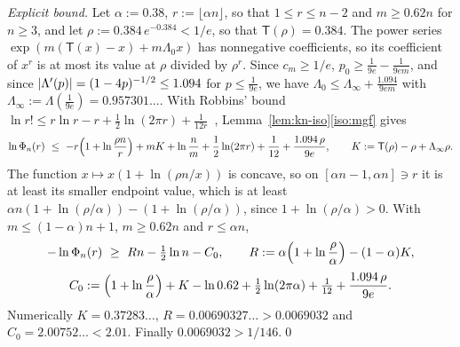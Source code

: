 \emph{Explicit bound.} Let $\alpha:=0.38$, $r:=\lfloor\alpha n\rfloor$, so that $1\le r\le n-2$ and $m\ge0.62n$ for $n\ge3$, and let $\rho:=0.384\,e^{-0.384}<1/e$, so that $\mathsf T(\rho)=0.384$. The power series $\exp(m(\mathsf T(x)-x)+m\Lambda_0x)$ has nonnegative coefficients, so its coefficient of $x^r$ is at most its value at $\rho$ divided by $\rho^r$. Since $c_m\ge1/e$, $p_0\ge\frac1{9e}-\frac1{9em}$, and since $\lvert \Lambda'(p)\rvert=(1-4p)^{-1/2}\le1.094$ for $p\le\frac1{9e}$, we have $\Lambda_0\le\Lambda_\infty+\frac{1.094}{9em}$ with $\Lambda_\infty:=\Lambda(\frac1{9e})=0.957301\ldots$. With Robbins' bound $\ln r!\le r\ln r-r+\frac12\ln(2\pi r)+\frac1{12r}$~\cite{Robbins55}, Lemma~\ref{lem:kn-iso}\ref{iso:mgf} gives
\[
  \ln\Phi_n(r)\ \le\ -r\Bigl(1+\ln\frac{\rho n}r\Bigr)+mK+\ln\frac nm+\frac12\ln(2\pi r)+\frac1{12}+\frac{1.094\,\rho}{9e},\qquad K:=\mathsf T(\rho)-\rho+\Lambda_\infty\rho .
\]
The function $x\mapsto x(1+\ln(\rho n/x))$ is concave, so on $[\alpha n-1,\alpha n]\ni r$ it is at least its smaller endpoint value, which is at least $\alpha n(1+\ln(\rho/\alpha))-(1+\ln(\rho/\alpha))$, since $1+\ln(\rho/\alpha)>0$. With $m\le(1-\alpha)n+1$, $m\ge0.62n$ and $r\le\alpha n$,
\[
  -\ln\Phi_n(r)\ \ge\ Rn-\tfrac12\ln n-C_0,\qquad R:=\alpha\Bigl(1+\ln\frac\rho\alpha\Bigr)-(1-\alpha)K,
\]
\[
  C_0:=\Bigl(1+\ln\frac\rho\alpha\Bigr)+K-\ln0.62+\tfrac12\ln(2\pi\alpha)+\tfrac1{12}+\frac{1.094\,\rho}{9e}.
\]
Numerically $K=0.37283\ldots$, $R=0.00690327\ldots>0.0069032$ and $C_0=2.00752\ldots<2.01$. Finally $0.0069032>1/146$.\qed

